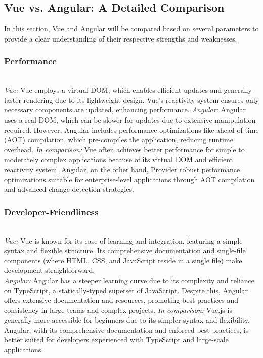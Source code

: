 \documentclass[conference]{IEEEtran}
\begin{document}

\subsection{Vue vs. Angular: A Detailed Comparison}

In this section, Vue and Angular will be compared based on several parameters to provide a clear understanding of their respective strengths and weaknesses.
\newline
\subsubsection{Performance}

\textit{\\Vue:} Vue employs a virtual DOM, which enables efficient updates and generally faster rendering due to its lightweight design. Vue’s reactivity system ensures only necessary components are updated, enhancing performance.
\newline\textit{Angular:} Angular uses a real DOM, which can be slower for updates due to extensive manipulation required. However, Angular includes performance optimizations like ahead-of-time (AOT) compilation, which pre-compiles the application, reducing runtime overhead.
\newline\textit{In comparison:} Vue often achieves better performance for simple to moderately complex applications because of its virtual DOM and efficient reactivity system. Angular, on the other hand, Provider robust performance optimizations suitable for enterprise-level applications through AOT compilation and advanced change detection strategies.
\newline
\subsubsection{Developer-Friendliness}
\textit{\\Vue:} Vue is known for its ease of learning and integration, featuring a simple syntax and flexible structure. Its comprehensive documentation and single-file components (where HTML, CSS, and JavaScript reside in a single file) make development straightforward.
\newline\textit{\\Angular:} Angular has a steeper learning curve due to its complexity and reliance on TypeScript, a statically-typed superset of JavaScript. Despite this, Angular offers extensive documentation and resources, promoting best practices and consistency in large teams and complex projects.
\newline\textit{In comparison:} Vue.js is generally more accessible for beginners due to its simpler syntax and flexibility. Angular, with its comprehensive documentation and enforced best practices, is better suited for developers experienced with TypeScript and large-scale applications.
\newline
\end{document}
